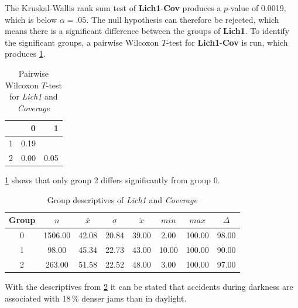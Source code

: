 The Kruskal-Wallis rank sum test of \textbf{Lich1}-\textbf{Cov} produces a $p$-value of 0.0019, which is below $\alpha=.05$. The null hypothesis can therefore be rejected, which means there is a significant difference between the groups of \textbf{Lich1}. To identify the significant groups, a pairwise Wilcoxon $T$-test for \textbf{Lich1}-\textbf{Cov} is run, which produces \cref{tbl:wilcoxon_baysis_matched_Lich1_Cov}. 
\begin{table}[ht!]
	\tiny
	\centering
    \begin{tabular}{rrr}
        \toprule
        & 0 & 1 \\ 
        \midrule
        1 & 0.19 &  \\ 
        2 & 0.00 & 0.05 \\ 
        \bottomrule
      \end{tabular}
	\caption{Pairwise Wilcoxon $T$-test for \textit{Lich1} and \textit{Coverage}}
	\label{tbl:wilcoxon_baysis_matched_Lich1_Cov}
\end{table}
\cref{tbl:wilcoxon_baysis_matched_Lich1_Cov} shows that only group 2 differs significantly from group 0. 
\begin{table}[ht!]
	\tiny
	\centering
    \begin{tabular}{c|c|c|c|c|c|c|c}
        \toprule
        Group & $n$ & $\bar{x}$ & $\sigma$ & $\tilde{x}$ & $min$ & $max$ & $\Delta$ \\  
        \midrule
        0 & 1506.00 & 42.08 & 20.84 & 39.00 & 2.00 & 100.00 & 98.00 \\ 
        1 & 98.00 & 45.34 & 22.73 & 43.00 & 10.00 & 100.00 & 90.00 \\ 
        2 & 263.00 & 51.58 & 22.52 & 48.00 & 3.00 & 100.00 & 97.00 \\ 
        \bottomrule
      \end{tabular}
	\caption{Group descriptives of \textit{Lich1} and \textit{Coverage}}
	\label{tbl:descriptives_baysis_matched_Lich1_Cov}
\end{table}
With the descriptives from \cref{tbl:descriptives_baysis_matched_Lich1_Cov} it can be stated that accidents during darkness are associated with 18\,\% denser jams than in daylight.


